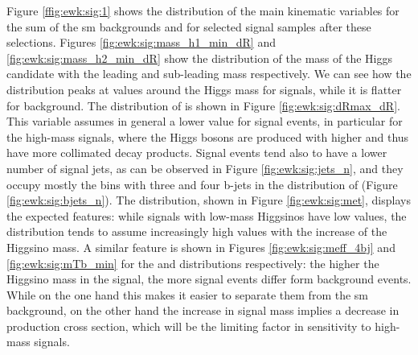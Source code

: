 Figure \ref{ffig:ewk:sig:1} shows the distribution of the main kinematic variables for 
the sum of the \gls{sm} backgrounds and for selected signal samples after these selections.
Figures \ref{fig:ewk:sig:mass_h1_min_dR} and \ref{fig:ewk:sig:mass_h2_min_dR} show the distribution of the mass of the Higgs 
candidate with the leading and sub-leading mass respectively. We can see how the distribution peaks at values around the Higgs mass for 
signals, while it is flatter for background. 
The distribution of \dRmax is shown in Figure \ref{fig:ewk:sig:dRmax_dR}. This variable assumes in general a lower value for 
signal events, in particular for the high-mass signals, where the Higgs bosons are produced with higher \pt and thus have 
more collimated decay products. Signal events tend also to have a lower number of signal jets, as can be observed in Figure 
\ref{fig:ewk:sig:jets_n}, and they occupy mostly the bins with three and four b-jets in the 
distribution of \nbjet (Figure \ref{fig:ewk:sig:bjets_n}). 
The \met distribution, shown in Figure \ref{fig:ewk:sig:met}, displays the expected features: while signals with low-mass Higgsinos 
have low \met values, the distribution tends to assume increasingly high values with the increase of the Higgsino mass. 
A similar feature is shown in Figures \ref{fig:ewk:sig:meff_4bj} and \ref{fig:ewk:sig:mTb_min} for the \meffb and \mtb distributions respectively: 
the higher the Higgsino mass in the signal, the more signal events differ form background events. 
While on the one hand this makes it easier to separate them from the \gls{sm} background, on the other hand the increase in signal mass 
implies a decrease in production cross section, which will be the limiting factor in sensitivity to high-mass signals. 


